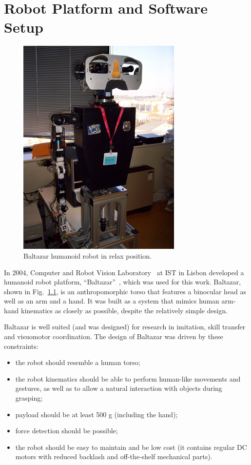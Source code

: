 
\chapter{Robot Platform and Software Setup}
\label{chap:robot_platform}

\begin{figure}
\centering
\includegraphics{figures/balta_relaxed}
\caption[Baltazar humanoid robot in relax position]{Baltazar humanoid robot in relax position.}
\label{img:balta_relaxed}
\end{figure}

In 2004, Computer and Robot Vision Laboratory~\cite{link:vislab} at IST in Lisbon developed a humanoid robot platform, ``Baltazar''~\cite{lopes:2004}, which was used for this work. Baltazar, shown in Fig.~\ref{img:balta_relaxed}, is an anthropomorphic torso that features a binocular head as well as an arm and a hand. It was built as a system that mimics human arm-hand kinematics as closely as possible, despite the relatively simple design.

Baltazar is well suited (and was designed) for research in imitation, skill transfer and visuomotor coordination. The design of Baltazar was driven by these constraints:
\begin{itemize}
\item the robot should resemble a human torso;

\item the robot kinematics should be able to perform human-like movements and gestures, as well as to allow a natural interaction with objects during grasping;

\item payload should be at least 500 g (including the hand);

\item force detection should be possible;

\item the robot should be easy to maintain and be low cost (it contains regular DC motors with reduced backlash and off-the-shelf mechanical parts).
\end{itemize}

